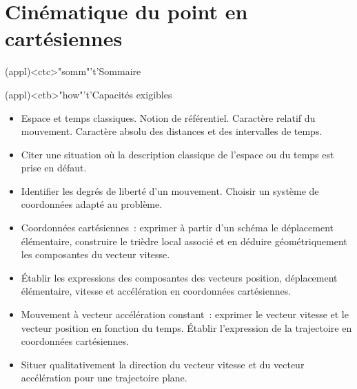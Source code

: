 \documentclass[../../main/main.tex]{subfiles}
\begin{document}
\setcounter{chapter}{0}


\chapter{Cinématique du point en cartésiennes}

\vspace*{\fill}

\begin{tcn}(appl)<ctc>"somm"'t'{Sommaire}
	\let\item\olditem
	\vspace{-15pt}
	\minitoc
	\vspace{-25pt}
\end{tcn}

\begin{tcn}[sidebyside]
	(appl)<ctb>"how"'t'{Capacités exigibles}
	\begin{itemize}[label=\rcheck]
		\item Espace et temps classiques. Notion de référentiel. Caractère relatif
		      du mouvement. Caractère absolu des distances et des intervalles de
		      temps.
		\item Citer une situation où la description classique de l'espace ou du
		      temps est prise en défaut.

		\item Identifier les degrés de liberté d'un mouvement. Choisir un système
		      de coordonnées adapté au problème.

		\item Coordonnées cartésiennes~: exprimer à partir d'un schéma le
		      déplacement élémentaire, construire le trièdre local associé et en
		      déduire géométriquement les composantes du vecteur vitesse.
	\end{itemize}
	\tcblower
	\begin{itemize}[label=\rcheck]
		\item Établir les expressions des composantes des vecteurs position,
		      déplacement élémentaire, vitesse et accélération en coordonnées
		      cartésiennes.

		\item Mouvement à vecteur accélération constant~: exprimer le vecteur
		      vitesse et le vecteur position en fonction du temps. Établir
		      l'expression de la trajectoire en coordonnées cartésiennes.

		\item Situer qualitativement la direction du vecteur vitesse et du
		      vecteur accélération pour une trajectoire plane.
	\end{itemize}
\end{tcn}
\end{document}
